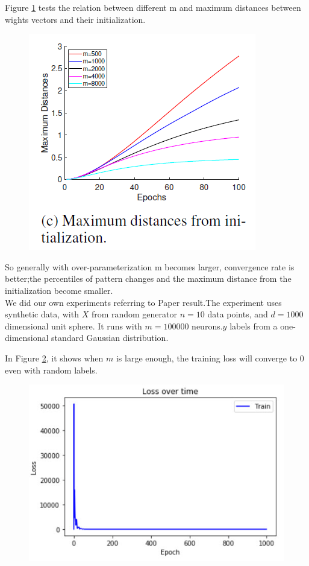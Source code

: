 \documentclass{article}
\begin{document}
Figure \ref{fig:maxdistance} tests the relation between different m and maximum distances between wights vectors and their initialization.
\begin{figure}[h]
	\centering
    \includegraphics[scale= 0.5]{pics/overparameterization/maximumdistance.PNG}
	\label{fig:maxdistance}
\end{figure}

So generally with over-parameterization m becomes larger, convergence rate is better;the percentiles of pattern changes and the maximum distance from the initialization become smaller.
\\

We did our own experiments referring to Paper\cite{SimonDu} result.The experiment uses synthetic data, with $X$ from random generator $n = 10$ data points, and $d = 1000$ dimensional unit sphere. It runs with $m = 100000$ neurons.$y$ labels from a one-dimensional standard Gaussian distribution.

In Figure \ref{fig:zeroloss}, it shows when $m$ is large enough, the training loss will converge to 0 even with random labels. 

\begin{figure}[h]
	\centering
    \includegraphics[scale = 0.5]{pics/overparameterization/loss_over_time_0-1k.jpg}
	\label{fig:zeroloss}
\end{figure}
\end{document}
